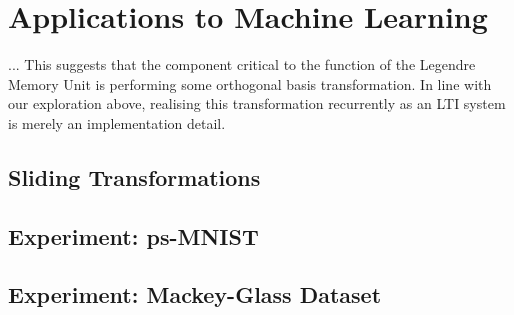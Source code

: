 
\section{Applications to Machine Learning}
\label{sec:applications_to_ml}

... This suggests that the component critical to the function of the Legendre Memory Unit is performing some orthogonal basis transformation. In line with our exploration above, realising this transformation recurrently as an LTI system is merely an implementation detail.

\subsection{Sliding Transformations}

\subsection{Experiment: ps-MNIST}

\subsection{Experiment: Mackey-Glass Dataset}